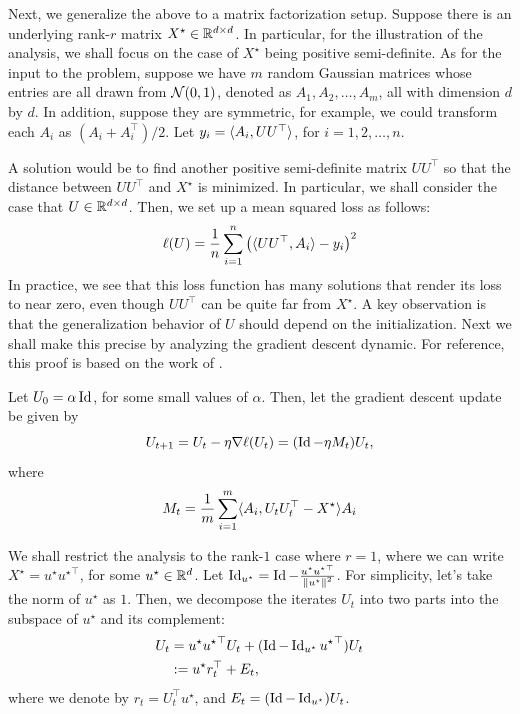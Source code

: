 Next, we generalize the above to a matrix factorization setup.
Suppose there is an underlying rank-$r$ matrix $X^{\star} \in \mathbb{R}^{d \times d}$.
In particular, for the illustration of the analysis, we shall focus on the case of $X^{\star}$ being positive semi-definite.
As for the input to the problem, suppose we have $m$ random Gaussian matrices whose entries are all drawn from $\mathcal{N}(0, 1)$, denoted as $A_1, A_2, \dots, A_m$, all with dimension $d$ by $d$.
In addition, suppose they are symmetric, for example, we could transform each $A_i$ as $(A_i + A_i^{\top}) / 2$.
Let $y_i = \langle A_i, UU^{\top} \rangle$, for $i = 1, 2, \dots, n$.

A solution would be to find another positive semi-definite matrix $UU^{\top}$ so that the distance between $UU^{\top}$ and $X^{\star}$ is minimized.
In particular, we shall consider the case that $U \in \mathbb{R}^{d \times d}$.
Then, we set up a mean squared loss as follows:
\[ \ell(U) = \frac 1 n \sum_{i=1}^n \left( \langle UU^{\top}, A_i \rangle - y_i \right)^2 \]
In practice, we see that this loss function has many solutions that render its loss to near zero, even though $UU^{\top}$ can be quite far from $X^{\star}$.
A key observation is that the generalization behavior of $U$ should depend on the initialization.
Next we shall make this precise by analyzing the gradient descent dynamic.
For reference, this proof is based on the work of \cite{li2018algorithmic}.

Let $U_0 = \alpha \operatorname{Id}$, for some small values of $\alpha$.
Then, let the gradient descent update be given by
\[ U_{t + 1} = U_t - \eta \nabla \ell(U_t) = (\operatorname{Id} - \eta M_t) U_t, \]
where \[ M_t = \frac 1 m \sum_{i=1}^m \langle A_i, U_t U_t^{\top} - X^{\star} \rangle A_i \]

We shall restrict the analysis to the rank-$1$ case where $r = 1$, where we can write $X^{\star} = u^{\star} {u^{\star}}^{\top}$, for some $u^{\star} \in \mathbb{R}^d$.
Let $\operatorname{Id}_{u^{\star}} = \operatorname{Id} - \frac {u^{\star} {u^{\star}}^{\top}} {\left\| u^{\star} \right\|^2}$.
For simplicity, let's take the norm of $u^{\star}$ as $1$.
Then, we decompose the iterates $U_t$ into two parts into the subspace of $u^{\star}$ and its complement:
\begin{align*}
    U_t &= u^{\star} {u^{\star}}^{\top} U_t + (\operatorname{Id} - \operatorname{Id}_{u^{\star}} {u^{\star}}^{\top}) U_t \\
        &:= u^{\star} r_t^{\top} + E_t,
\end{align*}
where we denote by $r_t = U_t^{\top} u^{\star}$, and $E_t = (\operatorname{Id} - \operatorname{Id}_{u^{\star}}) U_t$.

